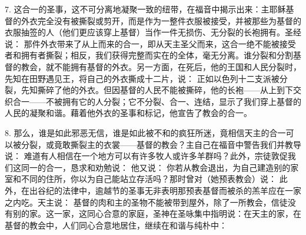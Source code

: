 7. 这合一的圣事，这不可分离地凝聚一致的纽带，在福音中揭示出来：主耶稣基督的外衣完全没有被撕裂或剪开，而是作为一整件衣服被接受，并被那些为基督的衣服抽签的人（他们更应该穿上基督）当作一件无损伤、无分裂的长袍拥有。圣经说： 那件外衣带来了从上而来的合一，即从天主圣父而来，这合一绝不能被接受者和拥有者撕裂；相反，我们获得完整而实在的全体，毫无分离。谁分裂和分割基督的教会，就不能拥有基督的外衣。另一方面，在死后，他的王国和人民分裂时，先知在田野遇见王，将自己的外衣撕成十二片，说： 正如以色列十二支派被分裂，先知撕碎了他的外衣。但因基督的人民不能被撕碎，他的长袍——从上到下交织合一——不被拥有它的人分裂；它不分裂、合一、连结，显示了我们穿上基督的人民的凝聚和谐。藉着他外衣的圣事和标记，他宣告了教会的合一。\par

8. 那么，谁是如此邪恶无信，谁是如此被不和的疯狂所迷，竟相信天主的合一可以被分裂，或竟敢撕裂主的衣裳——基督的教会？主自己在福音中警告我们并教导说： 难道有人相信在一个地方可以有许多牧人或许多羊群吗？此外，宗徒敦促我们这同一的合一，恳求和劝勉说： 他又说： 你若从教会退出，为自己建造别的家室和不同的住所，你以为自己能站立存活吗？那时曾对（她预表教会）说： 此外，在出谷纪的法律中，逾越节的圣事无非表明那预表基督而被杀的羔羊应在一家之内吃。天主说： 基督的肉和主的圣物不能被带到屋外，除了一所教会，信徒没有别的家。这一家，这同心合意的家庭，圣神在圣咏集中指明说：在天主的家，在基督的教会中，人们同心合意地居住，继续在和谐与纯朴中：\par

